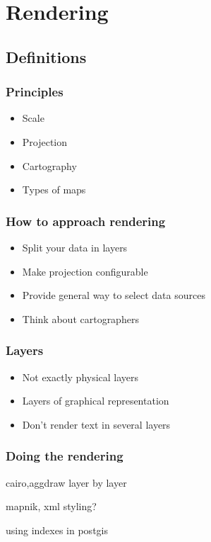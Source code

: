 \documentclass{beamer}
\begin{document}
\section{Rendering}

\subsection{Definitions}
\label{sec:definitions-1}

\begin{frame}
  \frametitle{Principles}
  \begin{itemize}
  \item Scale
  \item Projection
  \item Cartography
  \item Types of maps
  \end{itemize}
\end{frame}

\begin{frame}
  \frametitle{How to approach rendering}
  \begin{itemize}
  \item Split your data in layers
  \item Make projection configurable
  \item Provide general way to select data sources
  \item Think about cartographers
  \end{itemize}
\end{frame}

\begin{frame}
  \frametitle{Layers}
  \begin{itemize}
  \item Not exactly physical layers
  \item Layers of graphical representation
  \item Don't render text in several layers
  \end{itemize}
\end{frame}


\begin{frame}
  \frametitle{Doing the rendering}
  cairo,aggdraw
  layer by layer
\end{frame}

\begin{frame}
  mapnik, xml styling?
\end{frame}

\begin{frame}
  using indexes in postgis
\end{frame}
\end{document}
